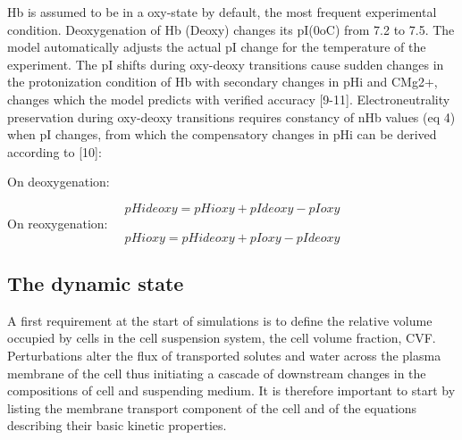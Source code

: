 \documentclass[a4paper]{article}
\begin{document}
Hb is assumed to be in a oxy-state by default, the most frequent experimental condition. Deoxygenation of Hb (Deoxy) changes its pI(0oC) from 7.2 to 7.5.  The model automatically adjusts the actual pI change for the temperature of the experiment.  The pI shifts during oxy-deoxy transitions cause sudden changes in the protonization condition of Hb with secondary changes in pHi and CMg2+, changes which the model predicts with verified accuracy [9-11].  Electroneutrality preservation during oxy-deoxy transitions requires constancy of nHb values (eq 4) when pI changes, from which the compensatory changes in pHi can be derived according to [10]: 

On deoxygenation:

\setcounter{equation}{0}
\renewcommand{\theequation}{4.\alph{equation}}
\begin{equation}
pHideoxy = pHioxy + pIdeoxy - pIoxy 
\end{equation}
On reoxygenation:
\begin{equation}
pHioxy = pHideoxy + pIoxy - pIdeoxy 
\end{equation}

\subsection{The dynamic state}

\setcounter{equation}{9}
\renewcommand{\theequation}{\arabic{equation}}

A first requirement at the start of simulations is to define the relative volume occupied by cells in the cell suspension system, the cell volume fraction, CVF.  Perturbations alter the flux of transported solutes and water across the plasma membrane of the cell thus initiating a cascade of downstream changes in the compositions of cell and suspending medium.  It is therefore important to start by listing the membrane transport component of the cell and of the equations describing their basic kinetic properties.  
\end{document}
